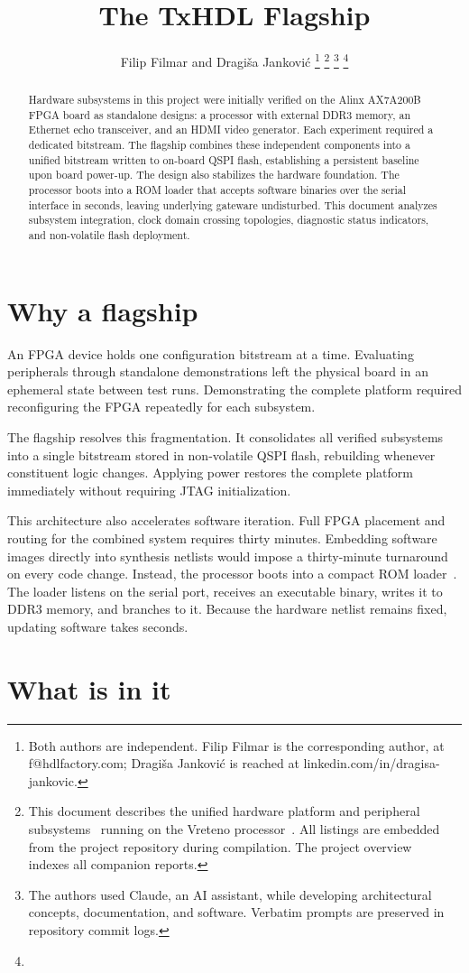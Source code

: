 \documentclass[journal,9pt]{IEEEtran}
\title{The TxHDL Flagship}
\author{Filip Filmar and Dragiša Janković%
\thanks{Both authors are independent. Filip Filmar is the
corresponding author, at f@hdlfactory.com; Dragiša Janković is
reached at linkedin.com/in/dragisa-jankovic.}%
\thanks{This document describes the unified hardware platform and peripheral
subsystems~\cite{eth,hdmi,axi} running on the Vreteno processor~\cite{vreteno}.
All listings are embedded from the project repository \code{HDL/txhdl} during
compilation. The project overview~\cite{cover} indexes all companion reports.}%
\thanks{The authors used Claude, an AI assistant, while developing
architectural concepts, documentation, and software. Verbatim prompts are
preserved in repository commit logs.}%
\thanks{\buildstamp}}
\begin{document}
\maketitle

\begin{abstract}
Hardware subsystems in this project were initially verified on the Alinx
AX7A200B FPGA board as standalone designs: a processor with external DDR3
memory, an Ethernet echo transceiver, and an HDMI video generator. Each
experiment required a dedicated bitstream. The flagship combines these
independent components into a unified bitstream written to on-board QSPI
flash, establishing a persistent baseline upon board power-up. The design also
stabilizes the hardware foundation. The processor boots into a ROM loader that
accepts software binaries over the serial interface in seconds, leaving
underlying gateware undisturbed. This document analyzes subsystem
integration, clock domain crossing topologies, diagnostic status indicators,
and non-volatile flash deployment.
\end{abstract}

\section{Why a flagship}
\label{sec:f-why}

An FPGA device holds one configuration bitstream at a time. Evaluating
peripherals through standalone demonstrations left the physical board in an
ephemeral state between test runs. Demonstrating the complete platform
required reconfiguring the FPGA repeatedly for each subsystem.

The flagship resolves this fragmentation. It consolidates all verified
subsystems into a single bitstream stored in non-volatile QSPI flash,
rebuilding whenever constituent logic changes. Applying power restores the
complete platform immediately without requiring JTAG initialization.

This architecture also accelerates software iteration. Full FPGA placement
and routing for the combined system requires thirty minutes. Embedding software
images directly into synthesis netlists would impose a thirty-minute turnaround
on every code change. Instead, the processor boots into a compact ROM
loader~\cite{vreteno}. The loader listens on the serial port, receives an
executable binary, writes it to DDR3 memory, and branches to it. Because the
hardware netlist remains fixed, updating software takes seconds.

\section{What is in it}
\label{sec:f-what}
\end{document}
